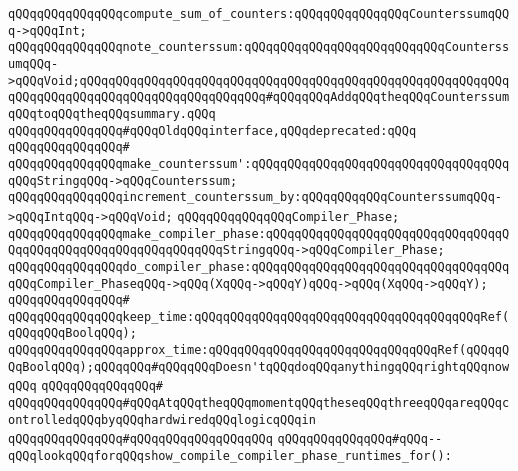 \verb|qQQqqQQqqQQqqQQqcompute_sum_of_counters:qQQqqQQqqQQqqQQqCounterssumqQQq->qQQqInt;|\newline
\newline
\verb|qQQqqQQqqQQqqQQqnote_counterssum:qQQqqQQqqQQqqQQqqQQqqQQqqQQqCounterssumqQQq->qQQqVoid;qQQqqQQqqQQqqQQqqQQqqQQqqQQqqQQqqQQqqQQqqQQqqQQqqQQqqQQqqQQqqQQqqQQqqQQqqQQqqQQqqQQqqQQqqQQqqQQq#qQQqqQQqAddqQQqtheqQQqCounterssumqQQqtoqQQqtheqQQqsummary.qQQq|\newline
\newline
\verb|qQQqqQQqqQQqqQQq#qQQqOldqQQqinterface,qQQqdeprecated:qQQq|\newline
\verb|qQQqqQQqqQQqqQQq#|\newline
\verb|qQQqqQQqqQQqqQQqmake_counterssum':qQQqqQQqqQQqqQQqqQQqqQQqqQQqqQQqqQQqqQQqStringqQQq->qQQqCounterssum;|\newline
\verb|qQQqqQQqqQQqqQQqincrement_counterssum_by:qQQqqQQqqQQqCounterssumqQQq->qQQqIntqQQq->qQQqVoid;|\newline
\newline
\verb|qQQqqQQqqQQqqQQqCompiler_Phase;|\newline
\newline
\verb|qQQqqQQqqQQqqQQqmake_compiler_phase:qQQqqQQqqQQqqQQqqQQqqQQqqQQqqQQqqQQqqQQqqQQqqQQqqQQqqQQqqQQqqQQqStringqQQq->qQQqCompiler_Phase;|\newline
\verb|qQQqqQQqqQQqqQQqdo_compiler_phase:qQQqqQQqqQQqqQQqqQQqqQQqqQQqqQQqqQQqqQQqCompiler_PhaseqQQq->qQQq(XqQQq->qQQqY)qQQq->qQQq(XqQQq->qQQqY);|\newline
\verb|qQQqqQQqqQQqqQQq#|\newline
\verb|qQQqqQQqqQQqqQQqkeep_time:qQQqqQQqqQQqqQQqqQQqqQQqqQQqqQQqqQQqqQQqRef(qQQqqQQqBoolqQQq);|\newline
\verb|qQQqqQQqqQQqqQQqapprox_time:qQQqqQQqqQQqqQQqqQQqqQQqqQQqqQQqRef(qQQqqQQqBoolqQQq);qQQqqQQq#qQQqqQQqDoesn'tqQQqdoqQQqanythingqQQqrightqQQqnowqQQq|\newline
\verb|qQQqqQQqqQQqqQQq#|\newline
\verb|qQQqqQQqqQQqqQQq#qQQqAtqQQqtheqQQqmomentqQQqtheseqQQqthreeqQQqareqQQqcontrolledqQQqbyqQQqhardwiredqQQqlogicqQQqin|\newline
\verb|qQQqqQQqqQQqqQQq#qQQqqQQqqQQqqQQqqQQq|\newline
\verb|qQQqqQQqqQQqqQQq#qQQq--qQQqlookqQQqforqQQqshow_compile_compiler_phase_runtimes_for():|\newline
